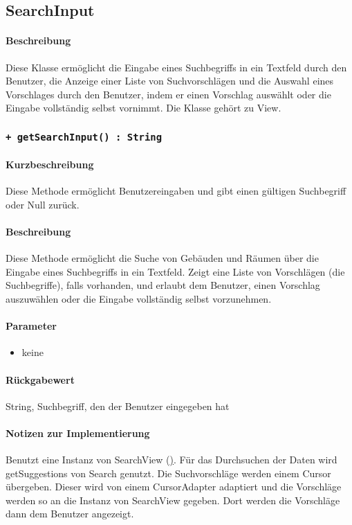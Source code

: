 \subsection{SearchInput}
\paragraph*{Beschreibung}
Diese Klasse ermöglicht die Eingabe eines Suchbegriffs in ein Textfeld durch den Benutzer, 
die Anzeige einer Liste von Suchvorschlägen und die Auswahl eines Vorschlages durch den Benutzer, 
indem er einen Vorschlag auswählt oder die Eingabe vollständig selbst vornimmt.
Die Klasse gehört zu View.

\subsubsection{\texttt{+ getSearchInput() : String}}%
\paragraph*{Kurzbeschreibung}
Diese Methode ermöglicht Benutzereingaben und gibt einen gültigen Suchbegriff oder Null zurück.
\paragraph*{Beschreibung}
Diese Methode ermöglicht die Suche von Gebäuden und Räumen über die Eingabe eines Suchbegriffs in ein Textfeld.
Zeigt eine Liste von Vorschlägen (die Suchbegriffe), falls vorhanden, und erlaubt dem Benutzer, einen Vorschlag auszuwählen oder die Eingabe vollständig selbst vorzunehmen.
\paragraph*{Parameter}
\begin{itemize}
    \item keine
\end{itemize}
\paragraph*{Rückgabewert}
String, Suchbegriff, den der Benutzer eingegeben hat
\paragraph*{Notizen zur Implementierung}
Benutzt eine Instanz von SearchView (\href{https://developer.android.com/guide/topics/search/search-dialog#SearchableActivity}).
Für das Durchsuchen der Daten wird getSuggestions von Search genutzt.
Die Suchvorschläge werden einem Cursor übergeben.
Dieser wird von einem CursorAdapter adaptiert und die Vorschläge werden so an die Instanz von SearchView gegeben.
Dort werden die Vorschläge dann dem Benutzer angezeigt.


